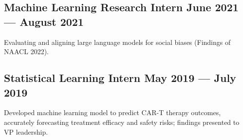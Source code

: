 \subsection{{Machine Learning Research Intern \hfill June 2021 --- August 2021}}
\begin{zitemize}
\item Evaluating and aligning large language models for social biases (Findings of NAACL 2022).
\end{zitemize}

\subsection{{Statistical Learning Intern \hfill May 2019 --- July 2019}}
\begin{zitemize}
\item Developed machine learning model to predict CAR-T therapy outcomes, accurately forecasting treatment efficacy and safety risks; findings presented to VP leadership.
\end{zitemize}



